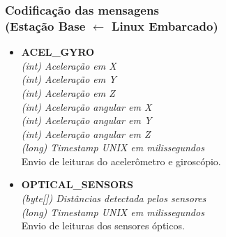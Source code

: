 \documentclass{beamer}
\begin{document}
	\begin{frame}
	\frametitle{Codificação das mensagens\\ (Estação Base $\leftarrow$ Linux Embarcado)}
		\begin{itemize}

		\item \textbf{ACEL\_GYRO} \\
		\textit{(int) Aceleração em X }\\
		\textit{(int) Aceleração em Y }\\
		\textit{(int) Aceleração em Z }\\
		\textit{(int) Aceleração angular em X }\\
		\textit{(int) Aceleração angular em Y }\\
		\textit{(int) Aceleração angular em Z }\\
		\textit{(long) Timestamp UNIX em milissegundos}\\
		Envio de leituras do acelerômetro e giroscópio.

		\item \textbf{OPTICAL\_SENSORS} \\
		\textit{(byte[]) Distâncias detectada pelos sensores} \\
		\textit{(long) Timestamp UNIX em milissegundos}\\
		Envio de leituras dos sensores ópticos.

		\end{itemize}
	\end{frame}
  
\end{document}

